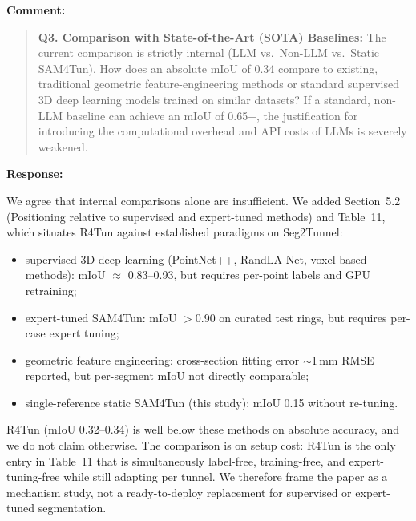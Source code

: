 \documentclass[11pt,a4paper]{article}
\newenvironment{commentblock}{%
  \par\smallskip\noindent\textbf{Comment:}\par
  \begin{quote}\itshape\color{black}
}{%
  \end{quote}\smallskip
}
\newenvironment{responseblock}{%
  \par\smallskip\noindent\textbf{Response:}\par
  \begingroup\color{responsegreen}
}{%
  \endgroup\smallskip
}
\begin{document}
\begin{commentblock}
\textbf{Q3. Comparison with State-of-the-Art (SOTA) Baselines:} The current comparison is strictly internal (LLM vs.\ Non-LLM vs.\ Static SAM4Tun). How does an absolute mIoU of 0.34 compare to existing, traditional geometric feature-engineering methods or standard supervised 3D deep learning models trained on similar datasets? If a standard, non-LLM baseline can achieve an mIoU of 0.65+, the justification for introducing the computational overhead and API costs of LLMs is severely weakened.
\end{commentblock}
\begin{responseblock}
We agree that internal comparisons alone are insufficient. We added Section~5.2 (Positioning relative to supervised and expert-tuned methods) and Table~11, which situates R4Tun against established paradigms on Seg2Tunnel:
\begin{itemize}[nosep]
  \item supervised 3D deep learning (PointNet++, RandLA-Net, voxel-based methods): mIoU $\approx$ 0.83--0.93, but requires per-point labels and GPU retraining;
  \item expert-tuned SAM4Tun: mIoU $>$0.90 on curated test rings, but requires per-case expert tuning;
  \item geometric feature engineering: cross-section fitting error $\sim$1\,mm RMSE reported, but per-segment mIoU not directly comparable;
  \item single-reference static SAM4Tun (this study): mIoU 0.15 without re-tuning.
\end{itemize}
R4Tun (mIoU 0.32--0.34) is well below these methods on absolute accuracy, and we do not claim otherwise. The comparison is on setup cost: R4Tun is the only entry in Table~11 that is simultaneously label-free, training-free, and expert-tuning-free while still adapting per tunnel. We therefore frame the paper as a mechanism study, not a ready-to-deploy replacement for supervised or expert-tuned segmentation.
\end{responseblock}
\end{document}

